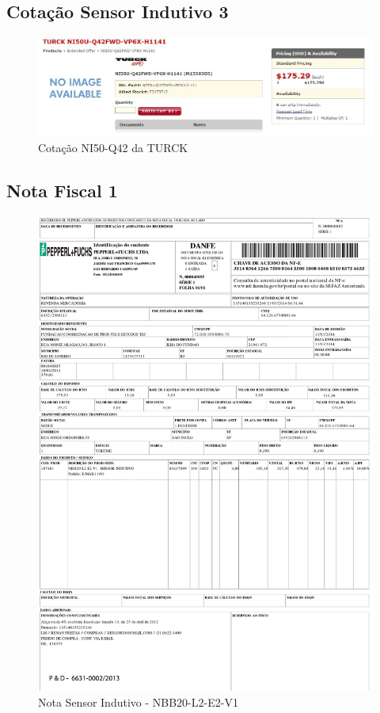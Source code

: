 \subsection{Cotação Sensor Indutivo 3 }
\begin{figure}[H]
 \centering
 \includegraphics[width=1\columnwidth]{Indutivo/price_quote_2}
 \caption{Cotação NI50-Q42 da TURCK }
\end{figure}

\subsection{Nota Fiscal 1}
\begin{figure}[H]
 \centering
 \includegraphics[width=1\columnwidth]{Indutivo/nota_indutivo.pdf}
 \caption{Nota Sensor Indutivo - NBB20-L2-E2-V1}
 \end{figure}
 
